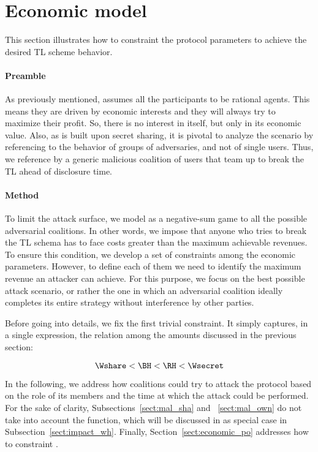 \section{Economic model}\label{sect:constraints}


This section illustrates how to constraint the protocol parameters to achieve the desired TL scheme behavior.

\paragraph*{Preamble}
As previously mentioned, \shortname assumes all the participants to be rational agents. 
This means they are driven by economic interests and they will always try to maximize their profit. 
So, there is no interest in \secret itself, but only in its economic value.
%
Also, as \shortname is built upon secret sharing, it is pivotal to analyze the scenario by referencing to the behavior of groups of adversaries, and not of single users.
Thus, we reference by \coalition a generic malicious coalition of users that team up to break the TL ahead of disclosure time.

\paragraph*{Method}
To limit the attack surface, we model \shortname as a negative-sum game to all the possible adversarial coalitions. 
In other words, we impose that anyone who tries to break the TL schema has to face costs greater than the maximum achievable revenues. 
To ensure this condition, we develop a set of constraints among the economic parameters.
However, to define each of them we need to identify the maximum revenue an attacker can achieve.
For this purpose, we focus on the best possible attack scenario, or rather the one in which an adversarial coalition ideally completes its entire strategy without interference by other parties.

Before going into details, we fix the first trivial constraint.
It simply captures, in a single expression, the relation among the amounts discussed in the previous section:

\begin{equation}\label{eqbase}
\Wshare < \BH < \RH < \Wsecret
\end{equation}

In the following, we address how coalitions could try to attack the protocol based on the role of its members and the time at which the attack could be performed.
For the sake of clarity, Subsections~\ref{sect:mal_sha} and ~\ref{sect:mal_own} do not take into account the \texttt{\algowhistleblowshare} function, which will be discussed in as special case in Subsection~\ref{sect:impact_wh}.
Finally, Section~\ref{sect:economic_po} addresses how to constraint \PO.


